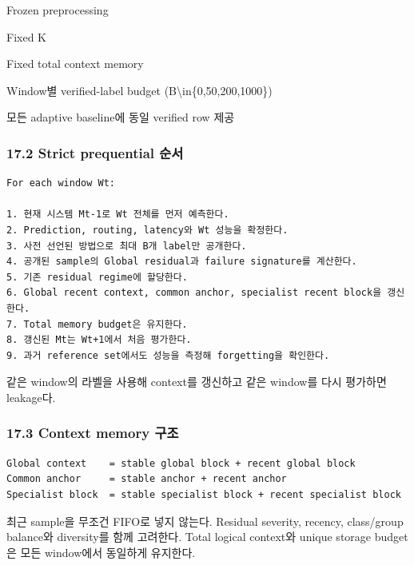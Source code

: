 \par\noindent \textbullet\enspace Frozen preprocessing


\par\noindent \textbullet\enspace Fixed K


\par\noindent \textbullet\enspace Fixed total context memory


\par\noindent \textbullet\enspace Window별 verified-label budget (B\textbackslash{}in\{0,50,200,1000\})


\par\noindent \textbullet\enspace 모든 adaptive baseline에 동일 verified row 제공


\subsubsection{17.2 Strict prequential 순서}

\begin{Verbatim}[breaklines=true,breakanywhere=true,fontsize=\scriptsize]
For each window Wt:

1. 현재 시스템 Mt-1로 Wt 전체를 먼저 예측한다.
2. Prediction, routing, latency와 Wt 성능을 확정한다.
3. 사전 선언된 방법으로 최대 B개 label만 공개한다.
4. 공개된 sample의 Global residual과 failure signature를 계산한다.
5. 기존 residual regime에 할당한다.
6. Global recent context, common anchor, specialist recent block을 갱신한다.
7. Total memory budget은 유지한다.
8. 갱신된 Mt는 Wt+1에서 처음 평가한다.
9. 과거 reference set에서도 성능을 측정해 forgetting을 확인한다.

\end{Verbatim}
같은 window의 라벨을 사용해 context를 갱신하고 같은 window를 다시 평가하면 leakage다.

\subsubsection{17.3 Context memory 구조}

\begin{Verbatim}[breaklines=true,breakanywhere=true,fontsize=\scriptsize]
Global context    = stable global block + recent global block
Common anchor     = stable anchor + recent anchor
Specialist block  = stable specialist block + recent specialist block

\end{Verbatim}
최근 sample을 무조건 FIFO로 넣지 않는다. Residual severity, recency, class/\allowbreak{}group balance와 diversity를 함께 고려한다. Total logical context와 unique storage budget은 모든 window에서 동일하게 유지한다.


